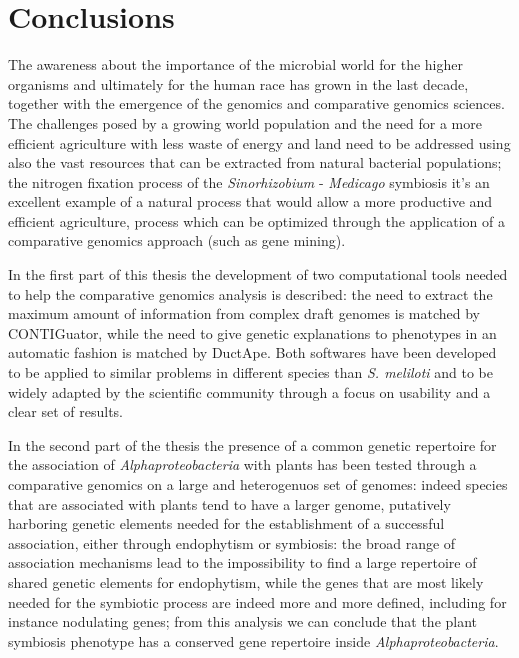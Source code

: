 \logvartrue
\chapter{Conclusions}

The awareness about the importance of the microbial world for the higher organisms and ultimately for the human race has grown in the last decade, together with the emergence of the genomics and comparative genomics sciences. The challenges posed by a growing world population and the need for a more efficient agriculture with less waste of energy and land need to be addressed using also the vast resources that can be extracted from natural bacterial populations; the nitrogen fixation process of the \textit{Sinorhizobium} - \textit{Medicago} symbiosis it's an excellent example of a natural process that would allow a more productive and efficient agriculture, process which can be optimized through the application of a comparative genomics approach (such as gene mining).

In the first part of this thesis the development of two computational tools needed to help the comparative genomics analysis is described: the need to extract the maximum amount of information from complex draft genomes is matched by CONTIGuator, while the need to give genetic explanations to phenotypes in an automatic fashion is matched by DuctApe. Both softwares have been developed to be applied to similar problems in different species than \textit{S. meliloti} and to be widely adapted by the scientific community through a focus on usability and a clear set of results.

In the second part of the thesis the presence of a common genetic repertoire for the association of \textit{Alphaproteobacteria} with plants has been tested through a comparative genomics on a large and heterogenuos set of genomes: indeed species that are associated with plants tend to have a larger genome, putatively harboring genetic elements needed for the establishment of a successful association, either through endophytism or symbiosis: the broad range of association mechanisms lead to the impossibility to find a large repertoire of shared genetic elements for endophytism, while the genes that are most likely needed for the symbiotic process are indeed more and more defined, including for instance nodulating genes; from this analysis we can conclude that the plant symbiosis phenotype has a conserved gene repertoire inside \textit{Alphaproteobacteria}.

